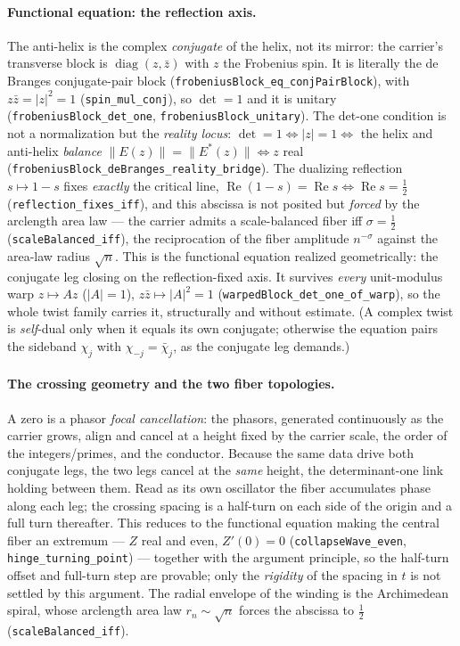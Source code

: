 \documentclass[11pt]{article}
\theoremstyle{definition}
\renewcommand{\Re}{\operatorname{Re}}
\begin{document}
\paragraph{Functional equation: the reflection axis.} The anti-helix is the complex \emph{conjugate}
of the helix, not its mirror: the carrier's transverse block is $\operatorname{diag}(z,\bar z)$ with
$z$ the Frobenius spin. It is literally the de Branges conjugate-pair block
(\texttt{frobeniusBlock\_eq\_conjPairBlock}), with $z\bar z=|z|^2=1$ (\texttt{spin\_mul\_conj}), so
$\det=1$ and it is unitary (\texttt{frobeniusBlock\_det\_one}, \texttt{frobeniusBlock\_unitary}). The
det-one condition is not a normalization but the \emph{reality locus}:
$\det=1\iff|z|=1\iff$ the helix and anti-helix \emph{balance} $\|E(z)\|=\|E^{*}(z)\|\iff z$ real
(\texttt{frobeniusBlock\_deBranges\_reality\_bridge}). The dualizing reflection $s\mapsto1-s$ fixes
\emph{exactly} the critical line, $\Re(1-s)=\Re s\iff\Re s=\tfrac12$ (\texttt{reflection\_fixes\_iff}),
and this abscissa is not posited but \emph{forced} by the arclength area law --- the carrier admits a
scale-balanced fiber iff $\sigma=\tfrac12$ (\texttt{scaleBalanced\_iff}), the reciprocation of the
fiber amplitude $n^{-\sigma}$ against the area-law radius $\sqrt n$. This is the functional equation
realized geometrically: the conjugate leg closing on the reflection-fixed axis. It survives
\emph{every} unit-modulus warp $z\mapsto Az$ ($|A|=1$), $z\bar z\mapsto|A|^2=1$
(\texttt{warpedBlock\_det\_one\_of\_warp}), so the whole twist family carries it, structurally and
without estimate. (A complex twist is \emph{self}-dual only when it equals its own conjugate;
otherwise the equation pairs the sideband $\chi_j$ with $\chi_{-j}=\bar\chi_j$, as the conjugate leg
demands.)

\paragraph{The crossing geometry and the two fiber topologies.} A zero is a phasor \emph{focal
cancellation}: the phasors, generated continuously as the carrier grows, align and cancel at a height
fixed by the carrier scale, the order of the integers/primes, and the conductor. Because the same data
drive both conjugate legs, the two legs cancel at the \emph{same} height, the determinant-one link
holding between them. Read as its own oscillator the fiber accumulates phase along each leg; the
crossing spacing is a half-turn on each side of the origin and a full turn thereafter. This reduces to
the functional equation making the central fiber an extremum --- $Z$ real and even, $Z'(0)=0$
(\texttt{collapseWave\_even}, \texttt{hinge\_turning\_point}) --- together with the argument principle,
so the half-turn offset and full-turn step are provable; only the \emph{rigidity} of the spacing in $t$
is not settled by this argument. The radial envelope of the winding is the Archimedean spiral, whose arclength area
law $r_n\sim\sqrt n$ forces the abscissa to $\tfrac12$ (\texttt{scaleBalanced\_iff}).
\end{document}
